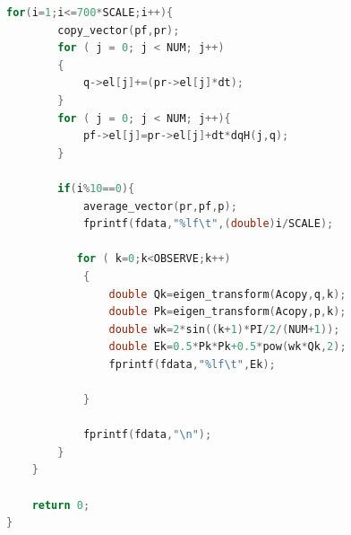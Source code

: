 \documentclass[10pt, a4paper]{article}
\begin{document}
\begin{lstlisting}[language=C]
    for(i=1;i<=700*SCALE;i++){
        copy_vector(pf,pr);
        for ( j = 0; j < NUM; j++)
        {
            q->el[j]+=(pr->el[j]*dt);
        }
        for ( j = 0; j < NUM; j++){
            pf->el[j]=pr->el[j]+dt*dqH(j,q);
        }
        
        if(i%10==0){
            average_vector(pr,pf,p);
            fprintf(fdata,"%lf\t",(double)i/SCALE);

           for ( k=0;k<OBSERVE;k++)
            {
                double Qk=eigen_transform(Acopy,q,k);
                double Pk=eigen_transform(Acopy,p,k);
                double wk=2*sin((k+1)*PI/2/(NUM+1));
                double Ek=0.5*Pk*Pk+0.5*pow(wk*Qk,2);
                fprintf(fdata,"%lf\t",Ek);
                
            }

            fprintf(fdata,"\n");
        }
    }

    return 0;
}
    \end{lstlisting}
\end{document}
